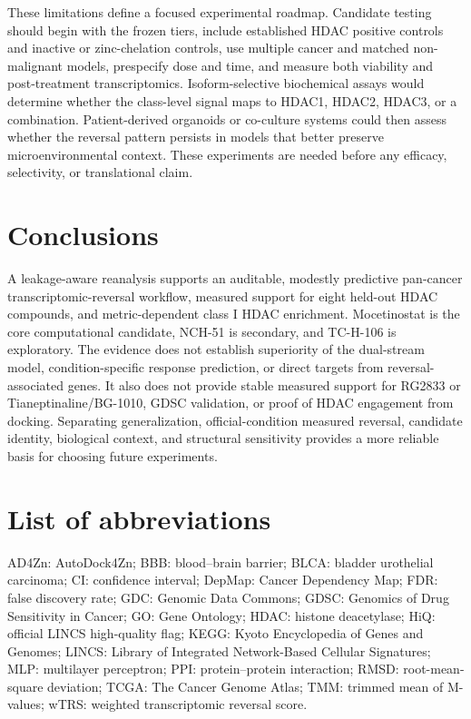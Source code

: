 \begin{minorrevision}
These limitations define a focused experimental roadmap. Candidate testing should begin with the frozen tiers, include established HDAC positive controls and inactive or zinc-chelation controls, use multiple cancer and matched non-malignant models, prespecify dose and time, and measure both viability and post-treatment transcriptomics. Isoform-selective biochemical assays would determine whether the class-level signal maps to HDAC1, HDAC2, HDAC3, or a combination. Patient-derived organoids or co-culture systems could then assess whether the reversal pattern persists in models that better preserve microenvironmental context. These experiments are needed before any efficacy, selectivity, or translational claim.\par
\end{minorrevision}

\section{Conclusions}

A leakage-aware reanalysis supports an auditable, modestly predictive pan-cancer transcriptomic-reversal workflow, measured support for eight held-out HDAC compounds, and metric-dependent class I HDAC enrichment. Mocetinostat is the core computational candidate, NCH-51 is secondary, and TC-H-106 is exploratory. The evidence does not establish superiority of the dual-stream model, condition-specific response prediction, or direct targets from reversal-associated genes. It also does not provide stable measured support for RG2833 or Tianeptinaline/BG-1010, GDSC validation, or proof of HDAC engagement from docking. Separating generalization, official-condition measured reversal, candidate identity, biological context, and structural sensitivity provides a more reliable basis for choosing future experiments.

\section*{List of abbreviations}

\begin{minorrevision}
AD4Zn: AutoDock4Zn; BBB: blood--brain barrier; BLCA: bladder urothelial carcinoma; CI: confidence interval; DepMap: Cancer Dependency Map; FDR: false discovery rate; GDC: Genomic Data Commons; GDSC: Genomics of Drug Sensitivity in Cancer; GO: Gene Ontology; HDAC: histone deacetylase; HiQ: official LINCS high-quality flag; KEGG: Kyoto Encyclopedia of Genes and Genomes; LINCS: Library of Integrated Network-Based Cellular Signatures; MLP: multilayer perceptron; PPI: protein--protein interaction; RMSD: root-mean-square deviation; TCGA: The Cancer Genome Atlas; TMM: trimmed mean of M-values; wTRS: weighted transcriptomic reversal score.\par
\end{minorrevision}
